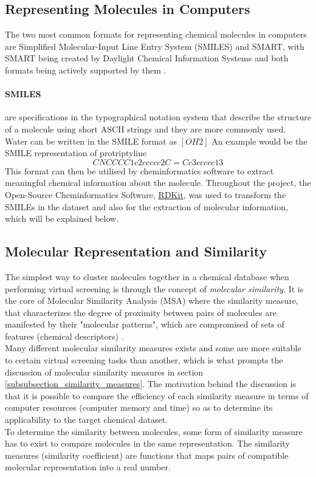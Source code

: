 \documentclass[a4paper,12pt]{report}
\begin{document}
		\subsection{Representing Molecules in Computers}
		The two most common formats for representing chemical molecules in computers are Simplified Molecular-Input Line Entry System (SMILES) and SMART, with SMART being created by Daylight Chemical Information Systems and both formats being actively supported by them \cite{OpenBabel2017}.
			\paragraph{SMILES} are specifications in the typographical notation system that describe the structure of a molecule using short ASCII strings and they are more commonly used. Water can be written in the SMILE format as $[OH2]$ An example would be the SMILE representation of protriptyline
				\begin{equation*}
					CNCCCC1c2ccccc2C=Cc3ccccc13
				\end{equation*}
			This format can then be utilised by cheminformatics software to extract meaningful chemical information about the molecule. Throughout the project, the Open-Source Cheminformatics Software, \href{www.rdkit.org}{RDKit}, was used to transform the SMILEs in the dataset and also for the extraction of molecular information, which will be explained below.
		\subsection{Molecular Representation and Similarity }
		The simplest way to cluster molecules together in a chemical database when performing virtual screening is through the concept of \textit{molecular similarity}. It is the core of Molecular Similarity Analysis (MSA) where the similarity measure, that characterizes the degree of proximity between pairs of molecules are manifested by their "molecular patterns", which are compromised of sets of features (chemical descriptors) \cite{Jurgen2004}. \\
		Many different molecular similarity measures exists and some are more suitable to certain virtual screening tasks than another, which is what prompts the discussion of molecular similarity measures in section \ref{subsubsection_similarity_measures}. The motivation behind the discussion is that it is possible to compare the efficiency of each similarity measure in terms of computer resources (computer memory and time) so as to determine its applicability to the target chemical dataset.\\
		To determine the similarity between molecules, some form of similarity measure has to exist to compare molecules in the same representation. The similarity measures (similarity coefficient) are functions that maps pairs of compatible molecular representation into a real number. 
\end{document}
